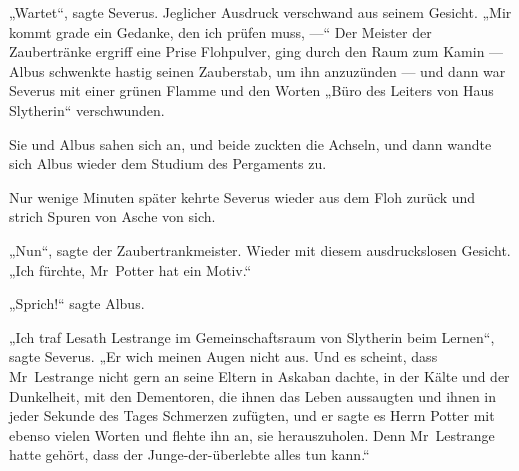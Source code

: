 „Wartet“, sagte Severus. Jeglicher Ausdruck verschwand aus seinem Gesicht.
„Mir kommt grade ein Gedanke, den ich prüfen muss, —“ Der Meister der Zaubertränke ergriff eine Prise Flohpulver, ging durch den Raum zum Kamin — Albus schwenkte hastig seinen Zauberstab, um ihn anzuzünden — und dann war Severus mit einer grünen Flamme und den Worten
„Büro des Leiters von Haus Slytherin“ verschwunden.

Sie und Albus sahen sich an, und beide zuckten die Achseln, und dann wandte sich Albus wieder dem Studium des Pergaments zu.

Nur wenige Minuten später kehrte Severus wieder aus dem Floh zurück und strich Spuren von Asche von sich.

„Nun“, sagte der Zaubertrankmeister. Wieder mit diesem ausdruckslosen Gesicht.
„Ich fürchte, Mr~Potter hat ein Motiv.“

„Sprich!“ sagte Albus.

„Ich traf Lesath Lestrange im Gemeinschaftsraum von Slytherin beim Lernen“, sagte Severus.
„Er wich meinen Augen nicht aus. Und es scheint, dass Mr~Lestrange nicht gern an seine Eltern in Askaban dachte, in der Kälte und der Dunkelheit, mit den Dementoren, die ihnen das Leben aussaugten und ihnen in jeder Sekunde des Tages Schmerzen zufügten, und er sagte es Herrn Potter mit ebenso vielen Worten und flehte ihn an, sie herauszuholen. Denn Mr~Lestrange hatte gehört, dass der Junge-der-überlebte alles tun kann.“

